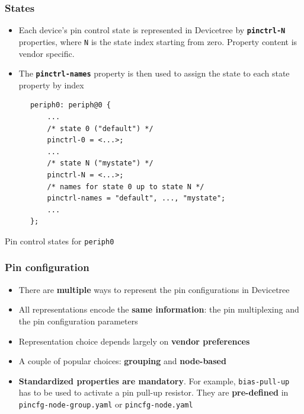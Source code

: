 \documentclass[handout]{beamer}
\begin{document}
\begin{frame}[fragile]
  \frametitle{States}

  \begin{itemize}
    \item<1-> Each device's pin control state is represented in Devicetree by
          \textbf{\texttt{pinctrl-N}} properties, where \texttt{N} is the state
          index starting from zero. Property content is vendor specific.
    \item<2-> The \textbf{\texttt{pinctrl-names}} property is then used to
          assign the state to each state property by index
  \end{itemize}

  \begin{listing}[H]
    \begin{verbatim}
      periph0: periph@0 {
          ...
          /* state 0 ("default") */
          pinctrl-0 = <...>;
          ...
          /* state N ("mystate") */
          pinctrl-N = <...>;
          /* names for state 0 up to state N */
          pinctrl-names = "default", ..., "mystate";
          ...
      };
    \end{verbatim}
    \caption{Pin control states for \texttt{periph0}}
  \end{listing}
\end{frame}

\begin{frame}
  \frametitle{Pin configuration}

  \begin{itemize}
    \item<1-> There are \textbf{multiple} ways to represent the pin
          configurations in Devicetree
    \item<2-> All representations encode the \textbf{same information}: the pin
          multiplexing and the pin configuration parameters
    \item<3-> Representation choice depends largely on
          \textbf{vendor preferences}
    \item<4-> A couple of popular choices: \textbf{grouping} and
          \textbf{node-based}
    \item<5-> \textbf{Standardized properties are mandatory}. For example,
          \texttt{bias-pull-up} has to be used to activate a pin pull-up
          resistor. They are \textbf{pre-defined} in
          \texttt{pincfg-node-group.yaml} or \texttt{pincfg-node.yaml}
  \end{itemize}
\end{frame}
\end{document}
